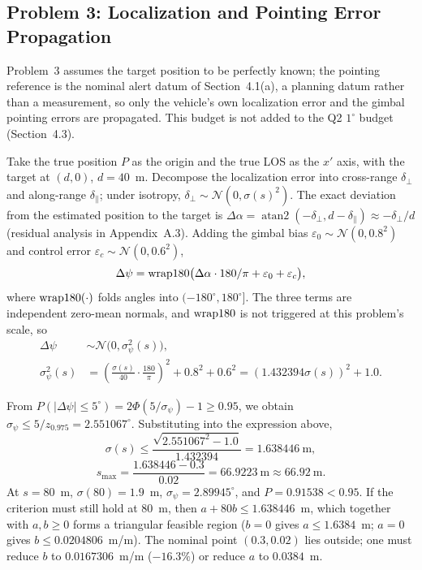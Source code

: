 \subsection{Problem 3: Localization and Pointing Error Propagation}
\label{sec:q3}

Problem~3 assumes the target position to be perfectly known; the pointing reference is the nominal alert datum of Section~4.1(a), a planning datum rather than a measurement, so only the vehicle's own localization error and the gimbal pointing errors are propagated. This budget is not added to the Q2 $1^\circ$ budget (Section~4.3).

Take the true position $P$ as the origin and the true LOS as the $x'$ axis, with the target at $(d,0)$, $d=40$~m. Decompose the localization error into cross-range $\delta_\perp$ and along-range $\delta_\parallel$; under isotropy, $\delta_\perp\sim\mathcal{N}(0,\sigma(s)^2)$. The exact deviation from the estimated position to the target is $\Delta\alpha=\operatorname{atan2}(-\delta_\perp,d-\delta_\parallel)\approx-\delta_\perp/d$ (residual analysis in Appendix~A.3). Adding the gimbal bias $\varepsilon_0\sim\mathcal{N}(0,0.8^2)$ and control error $\varepsilon_c\sim\mathcal{N}(0,0.6^2)$,
\begin{equation}
  \Delta\psi=\operatorname{wrap180}\bigl(\Delta\alpha\cdot180/\pi+\varepsilon_0+\varepsilon_c\bigr),
\end{equation}
where $\operatorname{wrap180}(\cdot)$ folds angles into $(-180^\circ,180^\circ]$. The three terms are independent zero-mean normals, and $\operatorname{wrap180}$ is not triggered at this problem's scale, so
\begin{equation}
\begin{split}
  \Delta\psi&\sim\mathcal{N}\bigl(0,\sigma_\psi^2(s)\bigr),\\
  \sigma_\psi^2(s)&=\left(\frac{\sigma(s)}{40}\cdot\frac{180}{\pi}\right)^2+0.8^2+0.6^2
  =(1.432394\sigma(s))^2+1.0.
\end{split}
\end{equation}

From $P(|\Delta\psi|\le5^\circ)=2\Phi(5/\sigma_\psi)-1\ge0.95$, we obtain $\sigma_\psi\le5/z_{0.975}=2.551067^\circ$. Substituting into the expression above,
\begin{equation}
  \sigma(s)\le\frac{\sqrt{2.551067^2-1.0}}{1.432394}=1.638446~\mathrm{m},
\end{equation}
\begin{equation}
  s_{\max}=\frac{1.638446-0.3}{0.02}=66.9223~\mathrm{m}\approx66.92~\mathrm{m}.
\end{equation}
At $s=80$~m, $\sigma(80)=1.9$~m, $\sigma_\psi=2.89945^\circ$, and $P=0.91538<0.95$. If the criterion must still hold at 80~m, then $a+80b\le1.638446$~m, which together with $a,b\ge0$ forms a triangular feasible region ($b=0$ gives $a\le1.6384$~m; $a=0$ gives $b\le0.0204806$~m/m). The nominal point $(0.3,0.02)$ lies outside; one must reduce $b$ to $0.0167306$~m/m ($-16.3\%$) or reduce $a$ to $0.0384$~m.

